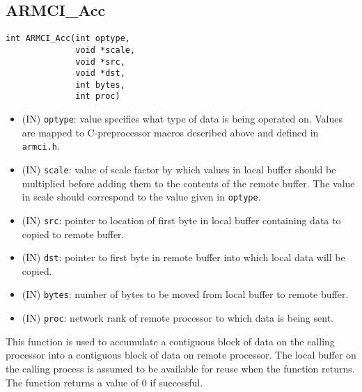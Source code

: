 \documentclass[12pt]{article}
\begin{document}
\subsection{ARMCI\_Acc}
\begin{verbatim}
int ARMCI_Acc(int optype,
              void *scale,
              void *src,
              void *dst,
              int bytes,
              int proc)
\end{verbatim}
\begin{itemize}
\item (IN) \texttt{optype}: value specifies what type of data is being operated
on. Values are mapped to C-preprocessor macros described above and defined in
\texttt{armci.h}.
\item (IN) \texttt{scale}: value of scale factor by which values in local buffer
should be multiplied before adding them to the contents of the remote buffer.
The value in scale should correspond to the value given in \texttt{optype}.
\item (IN) \texttt{src}: pointer to location of first byte in local buffer
containing data to copied to remote buffer.
\item (IN) \texttt{dst}: pointer to first byte in remote buffer into which local
data will be copied.
\item (IN) \texttt{bytes}: number of bytes to be moved from local buffer to
remote buffer.
\item (IN) \texttt{proc}: network rank of remote processor to which data is
being sent.
\end{itemize}
This function is used to accumulate a contiguous block of data on the calling
processor into a contiguous block of data on
remote processor. The local buffer on the calling process is assumed to be
available for reuse when the function returns. The function returns a value of 0
if successful.
\end{document}
